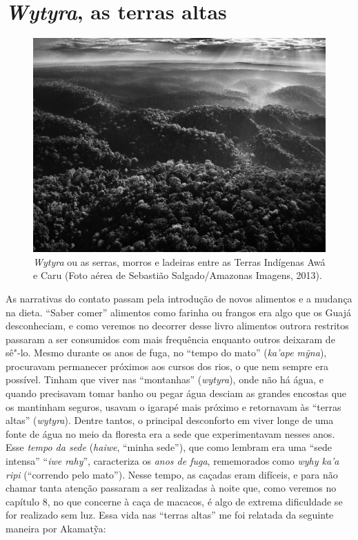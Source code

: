 \section{\emph{Wytyra}, as terras altas}

\begin{figure}[!ht]
\centering
  \includegraphics[width=\textwidth]{./imgs/Paisagem_SS}
\caption{\emph{Wytyra} ou as serras, morros e ladeiras entre as Terras Indígenas Awá e
Caru (Foto aérea de Sebastião Salgado/Amazonas Imagens, 2013).}
\end{figure}

As narrativas do contato passam pela introdução de novos alimentos e a
mudança na dieta. ``Saber comer'' alimentos como farinha ou frangos era
algo que os Guajá desconheciam, e como veremos no decorrer desse livro
alimentos outrora restritos passaram a ser consumidos com mais
frequência enquanto outros deixaram de sê"-lo. Mesmo durante os anos de
fuga, no ``tempo do mato'' (\emph{ka'ape mỹna}), procuravam permanecer
próximos aos cursos dos rios, o que nem sempre era possível. Tinham que
viver nas ``montanhas'' (\emph{wytyra}), onde não há água, e quando
precisavam tomar banho ou pegar água desciam as grandes encostas que os
mantinham seguros, usavam o igarapé mais próximo e retornavam às
``terras altas'' (\emph{wytyra}). Dentre tantos, o principal desconforto
em viver longe de uma fonte de água no meio da floresta era a sede que
experimentavam nesses anos. Esse \emph{tempo da sede} (\emph{haiwe},
``minha sede''), que como lembram era uma ``sede intensa'' ``\emph{iwe
rahy}'', caracteriza os \emph{anos de fuga}, rememorados como \emph{wyhy
ka'a ripi} (``correndo pelo mato''). Nesse tempo, as caçadas eram
difíceis, e para não chamar tanta atenção passaram a ser realizadas à
noite que, como veremos no capítulo 8, no que concerne à caça de
macacos, é algo de extrema dificuldade se for realizado sem luz. Essa
vida nas ``terras altas'' me foi relatada da seguinte maneira por
Akamatỹa:

